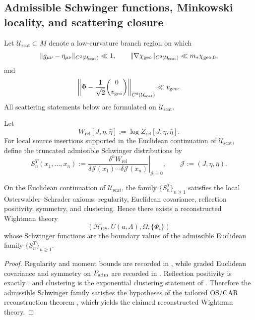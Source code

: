 \subsection{Admissible Schwinger functions, Minkowski locality, and scattering closure}

\begin{definition}
\label{def:laboratory-scattering-sector}
Let $\mathcal U_{\mathrm{scat}}\subset M$ denote a low-curvature branch region on which
\[
\|g_{\mu\nu}-\eta_{\mu\nu}\|_{C^2(\mathcal U_{\mathrm{scat}})}\ll 1,
\qquad
\|\nabla\chi_{\mathrm{geo}}\|_{C^0(\mathcal U_{\mathrm{scat}})}\ll m_*\chi_{\mathrm{geo},0},
\]
and
\[
\left\|
\Phi-\frac{1}{\sqrt2}\binom{0}{v_{\mathrm{geo}}}
\right\|_{C^0(\mathcal U_{\mathrm{scat}})}
\ll
v_{\mathrm{geo}}.
\]
All scattering statements below are formulated on $\mathcal U_{\mathrm{scat}}$.
\end{definition}

\begin{definition}
\label{def:admissible-schwinger-functions}
Let
\[
W_{\mathrm{rel}}[J,\eta,\bar\eta]:=\log Z_{\mathrm{rel}}[J,\eta,\bar\eta].
\]
For local source insertions supported in the Euclidean continuation of
$\mathcal U_{\mathrm{scat}}$, define the truncated admissible Schwinger distributions by
\[
S_n^T(x_1,\ldots,x_n)
:=
\left.
\frac{\delta^n W_{\mathrm{rel}}}{\delta\mathcal J(x_1)\cdots\delta\mathcal J(x_n)}
\right|_{\mathcal J=0},
\qquad
\mathcal J:=(J,\eta,\bar\eta).
\]
\end{definition}

\begin{theorem}
\label{thm:full-admissible-os-closure}
On the Euclidean continuation of $\mathcal U_{\mathrm{scat}}$, the family
$\{S_n^T\}_{n\ge 1}$ satisfies the local Osterwalder--Schrader axioms: regularity, Euclidean
covariance, reflection positivity, symmetry, and clustering. Hence there exists a reconstructed
Wightman theory
\[
(\mathcal H_{\mathrm{OS}},U(a,\Lambda),\Omega,\{\Phi_i\})
\]
whose Schwinger functions are the boundary values of the admissible Euclidean family
$\{S_n^T\}_{n\ge 1}$.
\end{theorem}

\begin{proof}
Regularity and moment bounds are recorded in
, while graded Euclidean covariance and symmetry on $P_{\mathrm{adm}}$ are
recorded in . Reflection positivity is exactly
, and clustering is the exponential clustering statement
of . Therefore the admissible Schwinger family satisfies
the hypotheses of the tailored OS/CAR reconstruction theorem
, which yields the claimed reconstructed Wightman theory.
\end{proof}

